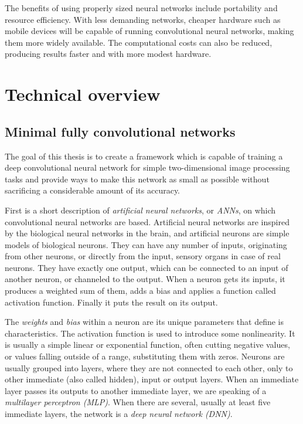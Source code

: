 \documentclass[12pt]{report}
\begin{document}
The benefits of using properly sized neural networks include portability and resource efficiency. With less demanding networks, cheaper hardware such as mobile devices will be capable of running convolutional neural networks, making them more widely available. The computational costs can also be reduced, producing results faster and with more modest hardware.

\chapter{Technical overview}
\section{Minimal fully convolutional networks}
The goal of this thesis is to create a framework which is capable of training a deep convolutional neural network for simple two-dimensional image processing tasks and provide ways to make this network as small as possible without sacrificing a considerable amount of its accuracy.

First is a short description of \textit{artificial neural networks}, or \textit{ANNs}, on which convolutional neural networks are based. Artificial neural networks are inspired by the biological neural networks in the brain, and artificial neurons are simple models of biological neurons. They can have any number of inputs, originating from other neurons, or directly from the input, sensory organs in case of real neurons. They have exactly one output, which can be connected to an input of another neuron, or channeled to the output. When a neuron gets its inputs, it produces a weighted sum of them, adds a bias and applies a function called activation function. Finally it puts the result on its output.

The \textit{weights} and \textit{bias} within a neuron are its unique parameters that define is characteristics. The activation function is used to introduce some nonlinearity. It is usually a simple linear or exponential function, often cutting negative values, or values falling outside of a range, substituting them with zeros. Neurons are usually grouped into layers, where they are not connected to each other, only to other immediate (also called hidden), input or output layers. When an immediate layer passes its outputs to another immediate layer, we are speaking of a \textit{multilayer perceptron (MLP)}. When there are several, usually at least five immediate layers, the network is a \textit{deep neural network (DNN)}.
\end{document}
